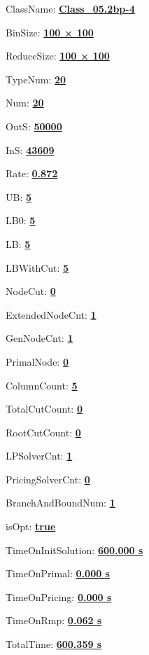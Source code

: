 \documentclass[11pt]{article}
\begin{document}
\pagestyle{empty}


ClassName: \underline{\textbf{Class_05.2bp-4}}
\par
BinSize: \underline{\textbf{100 × 100}}
\par
ReduceSize: \underline{\textbf{100 × 100}}
\par
TypeNum: \underline{\textbf{20}}
\par
Num: \underline{\textbf{20}}
\par
OutS: \underline{\textbf{50000}}
\par
InS: \underline{\textbf{43609}}
\par
Rate: \underline{\textbf{0.872}}
\par
UB: \underline{\textbf{5}}
\par
LB0: \underline{\textbf{5}}
\par
LB: \underline{\textbf{5}}
\par
LBWithCut: \underline{\textbf{5}}
\par
NodeCut: \underline{\textbf{0}}
\par
ExtendedNodeCnt: \underline{\textbf{1}}
\par
GenNodeCnt: \underline{\textbf{1}}
\par
PrimalNode: \underline{\textbf{0}}
\par
ColumnCount: \underline{\textbf{5}}
\par
TotalCutCount: \underline{\textbf{0}}
\par
RootCutCount: \underline{\textbf{0}}
\par
LPSolverCnt: \underline{\textbf{1}}
\par
PricingSolverCnt: \underline{\textbf{0}}
\par
BranchAndBoundNum: \underline{\textbf{1}}
\par
isOpt: \underline{\textbf{true}}
\par
TimeOnInitSolution: \underline{\textbf{600.000 s}}
\par
TimeOnPrimal: \underline{\textbf{0.000 s}}
\par
TimeOnPricing: \underline{\textbf{0.000 s}}
\par
TimeOnRmp: \underline{\textbf{0.062 s}}
\par
TotalTime: \underline{\textbf{600.359 s}}
\par
\newpage


\end{document}
